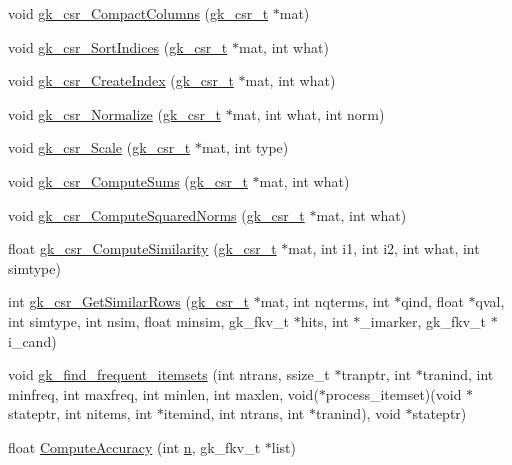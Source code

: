 \begin{DoxyCompactItemize}
\item 
void \hyperlink{a00077_a3e15963be76870160707368a5fe7f693}{gk\+\_\+csr\+\_\+\+Compact\+Columns} (\hyperlink{a00634}{gk\+\_\+csr\+\_\+t} $\ast$mat)
\item 
void \hyperlink{a00077_a06ffa04d1369de42ae3b7d2a9f85b91d}{gk\+\_\+csr\+\_\+\+Sort\+Indices} (\hyperlink{a00634}{gk\+\_\+csr\+\_\+t} $\ast$mat, int what)
\item 
void \hyperlink{a00077_a8bdd383ab80fe76507463f59c3d2863a}{gk\+\_\+csr\+\_\+\+Create\+Index} (\hyperlink{a00634}{gk\+\_\+csr\+\_\+t} $\ast$mat, int what)
\item 
void \hyperlink{a00077_aa74b347c4a6a07c0b2ea15c7d67f27b0}{gk\+\_\+csr\+\_\+\+Normalize} (\hyperlink{a00634}{gk\+\_\+csr\+\_\+t} $\ast$mat, int what, int norm)
\item 
void \hyperlink{a00077_adf45acdb60028f87304c1edc75baf194}{gk\+\_\+csr\+\_\+\+Scale} (\hyperlink{a00634}{gk\+\_\+csr\+\_\+t} $\ast$mat, int type)
\item 
void \hyperlink{a00077_a3cc2a64b0ead1b41ad824bc9401f1b84}{gk\+\_\+csr\+\_\+\+Compute\+Sums} (\hyperlink{a00634}{gk\+\_\+csr\+\_\+t} $\ast$mat, int what)
\item 
void \hyperlink{a00077_adb5c0f634607e45daaf7098399f1da0e}{gk\+\_\+csr\+\_\+\+Compute\+Squared\+Norms} (\hyperlink{a00634}{gk\+\_\+csr\+\_\+t} $\ast$mat, int what)
\item 
float \hyperlink{a00077_a86d96bf7b4f265b0e4a3b244ba031b0d}{gk\+\_\+csr\+\_\+\+Compute\+Similarity} (\hyperlink{a00634}{gk\+\_\+csr\+\_\+t} $\ast$mat, int i1, int i2, int what, int simtype)
\item 
int \hyperlink{a00077_a52c619261980e7f2d6e4b48096ee1813}{gk\+\_\+csr\+\_\+\+Get\+Similar\+Rows} (\hyperlink{a00634}{gk\+\_\+csr\+\_\+t} $\ast$mat, int nqterms, int $\ast$qind, float $\ast$qval, int simtype, int nsim, float minsim, gk\+\_\+fkv\+\_\+t $\ast$hits, int $\ast$\+\_\+imarker, gk\+\_\+fkv\+\_\+t $\ast$i\+\_\+cand)
\item 
void \hyperlink{a00077_a49ce3918c2232fa7e293e4221d5215b1}{gk\+\_\+find\+\_\+frequent\+\_\+itemsets} (int ntrans, ssize\+\_\+t $\ast$tranptr, int $\ast$tranind, int minfreq, int maxfreq, int minlen, int maxlen, void($\ast$process\+\_\+itemset)(void $\ast$stateptr, int nitems, int $\ast$itemind, int ntrans, int $\ast$tranind), void $\ast$stateptr)
\item 
float \hyperlink{a00077_ae4d47a20b362605d1521159a9b090a04}{Compute\+Accuracy} (int \hyperlink{a00623_a781a04ab095280f838ff3eb0e51312e0}{n}, gk\+\_\+fkv\+\_\+t $\ast$list)

\end{DoxyCompactItemize}
